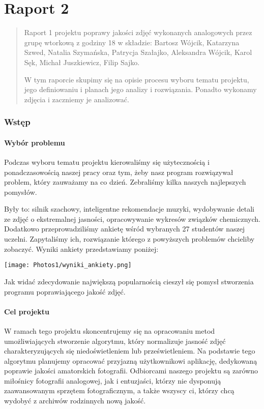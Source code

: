 \documentclass[]{mwart}
\begin{document}
\vfill
\newpage
\part{Raport 2}


\vfill
\begin{abstract}
    Raport 1 projektu poprawy jakości zdjęć wykonanych analogowych przez grupę wtorkową z godziny 18
    w składzie:  Bartosz Wójcik, Katarzyna Szwed, Natalia Szymańska,
    Patrycja Szałajko, Aleksandra Wójcik, Karol Sęk, Michał Juszkiewicz, Filip Sajko.

    W tym raporcie skupimy się na opisie procesu wyboru tematu projektu, jego definiowaniu
    i planach jego analizy i rozwiązania. Ponadto wykonamy zdjęcia i zaczniemy je analizować.
\end{abstract}







\newpage










\section{Wstęp}
\subsection{Wybór problemu}
Podczas wyboru tematu projektu kierowaliśmy się użytecznością
i ponadczasowością naszej pracy oraz tym, żeby nasz program
rozwiązywał problem,  który zauważamy na co dzień. Zebraliśmy
kilka naszych najlepszych pomysłów.

Były to: silnik szachowy, inteligentne
rekomendacje muzyki, wydobywanie detali ze zdjęć o ekstremalnej
jasności, opracowywanie wykresów związków chemicznych.
Dodatkowo przeprowadziliśmy ankietę wśród wybranych 27
studentów naszej uczelni. Zapytaliśmy ich, rozwiązanie
którego z powyższych problemów chcieliby zobaczyć.
Wyniki ankiety przedstawiamy poniżej:

\texttt{[image: Photos1/wyniki\_ankiety.png]}

Jak widać zdecydowanie największą popularnością
cieszył się pomysł stworzenia programu poprawiającego jakość zdjęć.

\subsection{Cel projektu}
W ramach tego projektu skoncentrujemy się na opracowaniu metod
umożliwiających stworzenie algorytmu, który normalizuje jasność
zdjęć charakteryzujących się niedoświetleniem lub
prześwietleniem. Na podstawie tego algorytmu planujemy opracować
przyjazną użytkownikowi aplikację, dedykowaną poprawie jakości
amatorskich fotografii. Odbiorcami naszego projektu są zarówno
miłośnicy fotografii analogowej, jak i entuzjaści, którzy nie
dysponują zaawansowanym sprzętem fotograficznym, a także
wszyscy ci, którzy chcą wydobyć z archiwów rodzinnych
nową jakość.
\end{document}
